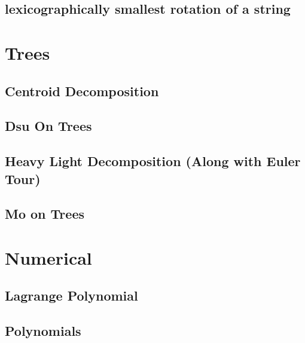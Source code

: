 \subsection{lexicographically smallest rotation of a string}
\vspace{-2ex}
\raggedbottom
\vspace{-3.2ex}
\hrulefill

\section{Trees}
\subsection{Centroid Decomposition}
\vspace{-2ex}
\raggedbottom
\vspace{-3.2ex}
\hrulefill
\subsection{Dsu On Trees}
\vspace{-2ex}
\raggedbottom
\vspace{-3.2ex}
\hrulefill
\subsection{Heavy Light Decomposition (Along with Euler Tour)}
\vspace{-2ex}
\raggedbottom
\vspace{-3.2ex}
\hrulefill
\subsection{Mo on Trees}
\vspace{-2ex}
\raggedbottom
\vspace{-3.2ex}
\hrulefill

\section{Numerical}
\subsection{Lagrange Polynomial}
\vspace{-2ex}
\raggedbottom
\vspace{-3.2ex}
\hrulefill
\subsection{Polynomials}
\vspace{-2ex}
\raggedbottom
\vspace{-3.2ex}
\hrulefill

